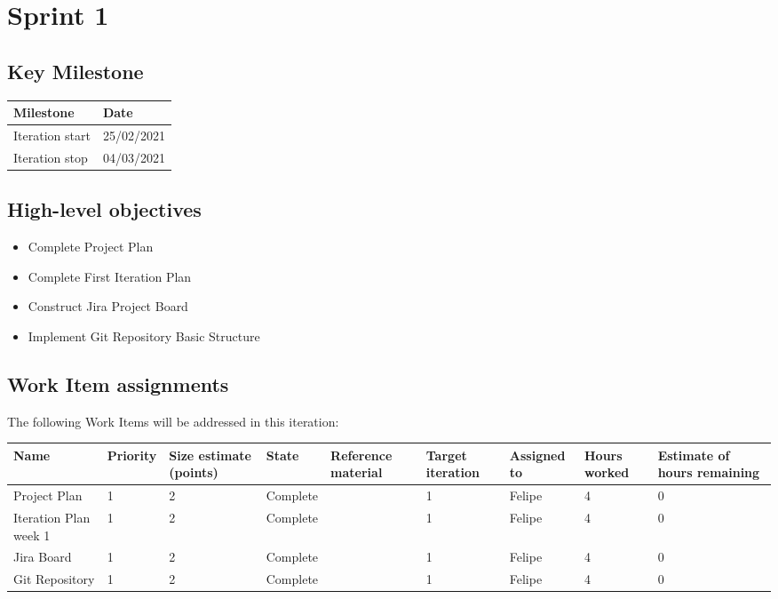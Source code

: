 \clearpage
\section{Sprint 1}

\subsection*{Key Milestone}

\noindent\begin{tabular}{|l|l|}
\hline
Milestone       & Date \\ \hline
Iteration start & 25/02/2021  \\ \hline
Iteration stop  &  04/03/2021 \\ \hline
\end{tabular}

\subsection*{High-level objectives}

\begin{itemize}
	\item Complete Project Plan
	\item	Complete First Iteration Plan
	\item	Construct Jira Project Board
	\item Implement Git Repository Basic Structure
\end{itemize}

\subsection*{Work Item assignments}

The following Work Items will be addressed in this iteration:

\begin{adjustbox}{width=\textwidth}
\noindent\begin{tabular}{|l|l|l|l|l|l|l|l|l|}
\hline
Name & Priority & Size estimate (points) & State & Reference material & Target iteration & Assigned to & Hours worked & Estimate of hours remaining \\ \hline
Project Plan    & 1 &  2 &  Complete  & & 1 & Felipe & 4 & 0 \\ \hline
Iteration Plan week 1 & 1 &  2 &  Complete  & & 1 & Felipe & 4 & 0 \\ \hline
Jira Board & 1 &  2 &  Complete  & & 1 & Felipe & 4 & 0 \\ \hline
Git Repository & 1 &  2 &  Complete  & & 1 & Felipe & 4 & 0 \\ \hline
\end{tabular}
\end{adjustbox}

